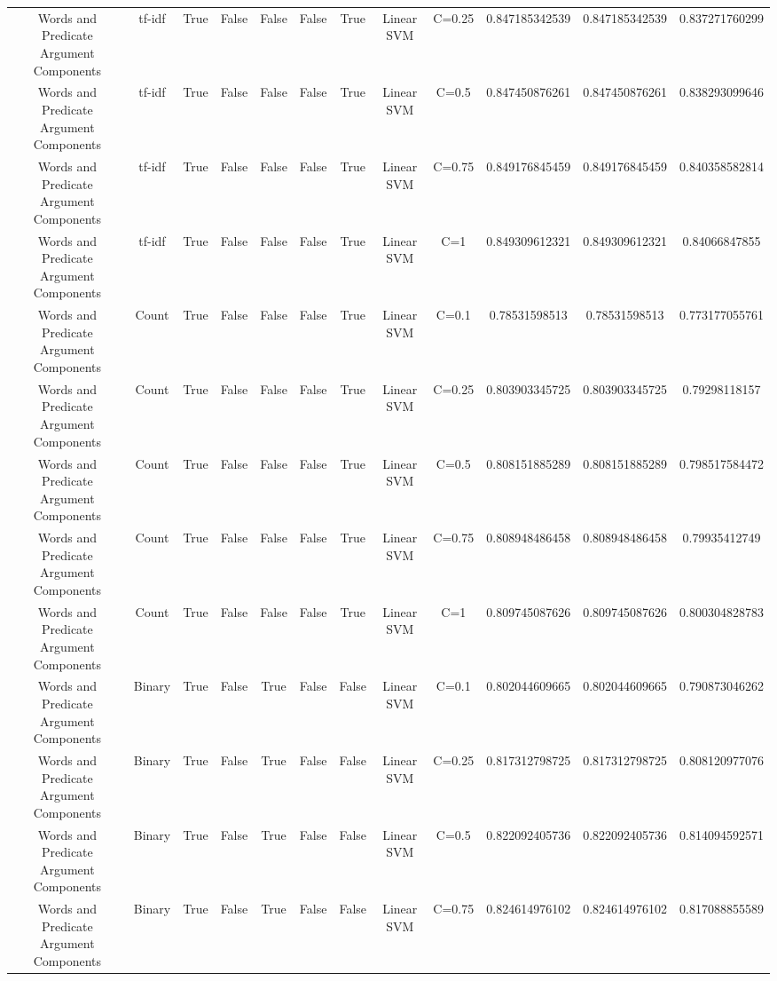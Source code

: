 \documentclass[11pt]{article}
\begin{document}
\begin{tabular}{|c|c|c|c|c|c|c|c|c|c|c|c|}
Words and Predicate Argument Components & tf-idf & True & False & False & False & True & Linear SVM & C=0.25 & 0.847185342539 & 0.847185342539 & 0.837271760299 \\ 
Words and Predicate Argument Components & tf-idf & True & False & False & False & True & Linear SVM & C=0.5 & 0.847450876261 & 0.847450876261 & 0.838293099646 \\ 
Words and Predicate Argument Components & tf-idf & True & False & False & False & True & Linear SVM & C=0.75 & 0.849176845459 & 0.849176845459 & 0.840358582814 \\ 
Words and Predicate Argument Components & tf-idf & True & False & False & False & True & Linear SVM & C=1 & 0.849309612321 & 0.849309612321 & 0.84066847855 \\ 
Words and Predicate Argument Components & Count & True & False & False & False & True & Linear SVM & C=0.1 & 0.78531598513 & 0.78531598513 & 0.773177055761 \\ 
Words and Predicate Argument Components & Count & True & False & False & False & True & Linear SVM & C=0.25 & 0.803903345725 & 0.803903345725 & 0.79298118157 \\ 
Words and Predicate Argument Components & Count & True & False & False & False & True & Linear SVM & C=0.5 & 0.808151885289 & 0.808151885289 & 0.798517584472 \\ 
Words and Predicate Argument Components & Count & True & False & False & False & True & Linear SVM & C=0.75 & 0.808948486458 & 0.808948486458 & 0.79935412749 \\ 
Words and Predicate Argument Components & Count & True & False & False & False & True & Linear SVM & C=1 & 0.809745087626 & 0.809745087626 & 0.800304828783 \\ 
Words and Predicate Argument Components & Binary & True & False & True & False & False & Linear SVM & C=0.1 & 0.802044609665 & 0.802044609665 & 0.790873046262 \\ 
Words and Predicate Argument Components & Binary & True & False & True & False & False & Linear SVM & C=0.25 & 0.817312798725 & 0.817312798725 & 0.808120977076 \\ 
Words and Predicate Argument Components & Binary & True & False & True & False & False & Linear SVM & C=0.5 & 0.822092405736 & 0.822092405736 & 0.814094592571 \\ 
Words and Predicate Argument Components & Binary & True & False & True & False & False & Linear SVM & C=0.75 & 0.824614976102 & 0.824614976102 & 0.817088855589 \\ 

\end{tabular}
\end{document}

